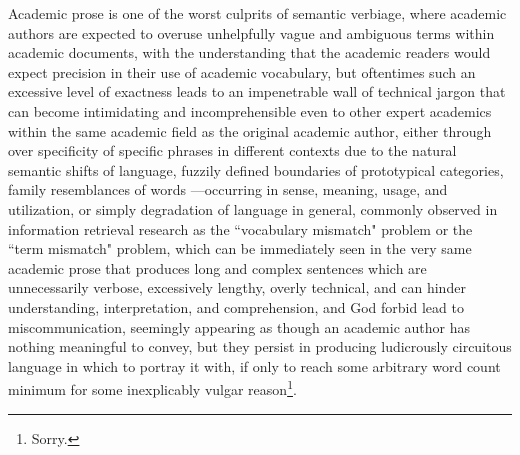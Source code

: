 
Academic prose is one of the worst culprits of semantic verbiage, where academic authors are expected to overuse unhelpfully vague and ambiguous terms within academic documents, with the understanding that the academic readers would expect precision in their use of academic vocabulary, but oftentimes such an excessive level of exactness leads to an impenetrable wall of technical jargon that can become intimidating and incomprehensible even to other expert academics within the same academic field as the original academic author, either through over specificity of specific phrases in different contexts due to the natural semantic shifts of language, fuzzily defined boundaries of prototypical categories, family resemblances of words ---occurring in sense, meaning, usage, and utilization, or simply degradation of language in general, commonly observed in information retrieval research as the ``vocabulary mismatch" problem or the ``term mismatch" problem, which can be immediately seen in the very same academic prose that produces long and complex sentences which are unnecessarily verbose, excessively lengthy, overly technical, and can hinder understanding, interpretation, and comprehension, and God forbid lead to miscommunication, seemingly appearing as though an academic author has nothing meaningful to convey, but they persist in producing ludicrously circuitous language in which to portray it with, if only to reach some arbitrary word count minimum for some inexplicably vulgar reason\footnote{Sorry.}. 

